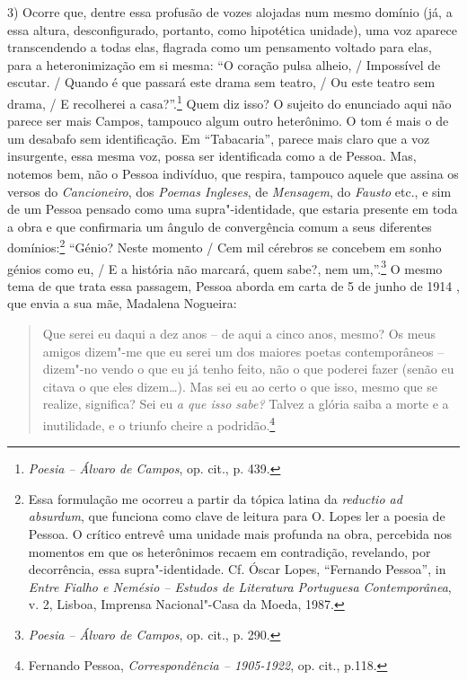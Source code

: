 3) Ocorre que, dentre essa profusão de vozes alojadas num mesmo domínio
(já, a essa altura, desconfigurado, portanto, como hipotética unidade),
uma voz aparece transcendendo a todas elas, flagrada como um pensamento
voltado para elas, para a heteronimização em si mesma: ``O coração pulsa
alheio, / Impossível de escutar. / Quando é que passará este drama sem
teatro, / Ou este teatro sem drama, / E recolherei a casa?''.\footnote{\emph{Poesia
  -- Álvaro de Campos}, op. cit., p. 439.} Quem diz isso? O sujeito do
enunciado aqui não parece ser mais Campos, tampouco algum outro
heterônimo. O tom é mais o de um desabafo sem identificação. Em
``Tabacaria'', parece mais claro que a voz insurgente, essa mesma voz,
possa ser identificada como a de Pessoa. Mas, notemos bem, não o Pessoa
indivíduo, que respira, tampouco aquele que assina os versos do
\emph{Cancioneiro}, dos \emph{Poemas Ingleses}, de \emph{Mensagem}, do
\emph{Fausto} etc., e sim de um Pessoa pensado como uma
supra"-identidade, que estaria presente em toda a obra e que confirmaria
um ângulo de convergência comum a seus diferentes domínios:\footnote{Essa
  formulação me ocorreu a partir da tópica latina da \emph{reductio ad
  absurdum}, que funciona como clave de leitura para O. Lopes ler a
  poesia de Pessoa. O crítico entrevê uma unidade mais profunda na obra,
  percebida nos momentos em que os heterônimos recaem em contradição,
  revelando, por decorrência, essa supra"-identidade. Cf. Óscar Lopes,
  ``Fernando Pessoa'', in \emph{Entre Fialho e Nemésio -- Estudos de
  Literatura Portuguesa Contemporânea}, v. 2, Lisboa, Imprensa
  Nacional"-Casa da Moeda, 1987.} ``Génio? Neste momento / Cem mil
cérebros se concebem em sonho génios como eu, / E a história não
marcará, quem sabe?, nem um,''.\footnote{\emph{Poesia -- Álvaro de
  Campos}, op. cit., p. 290.} O mesmo tema de que trata essa passagem,
Pessoa aborda em carta de 5 de junho de 1914 , que envia a sua mãe,
Madalena Nogueira:

\begin{quote}
Que serei eu daqui a dez anos -- de aqui a cinco anos, mesmo? Os meus
amigos dizem"-me que eu serei um dos maiores poetas contemporâneos --
dizem"-no vendo o que eu já tenho feito, não o que poderei fazer (senão
eu citava o que eles dizem\ldots{}). Mas sei eu ao certo o que isso, mesmo
que se realize, significa? Sei eu \emph{a que isso sabe?} Talvez a
glória saiba a morte e a inutilidade, e o triunfo cheire a
podridão.\footnote{Fernando Pessoa, \emph{Correspondência -- 1905-1922},
  op. cit., p.118.}
\end{quote}

